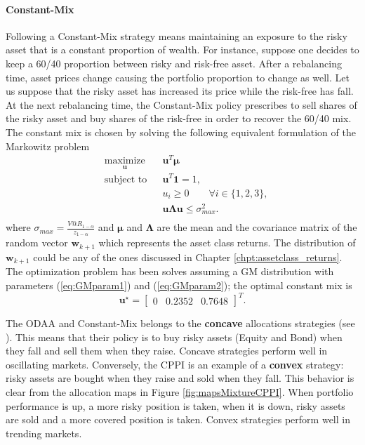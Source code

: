 \paragraph{Constant-Mix}
Following a Constant-Mix strategy means maintaining an exposure to the risky asset that is a constant proportion of wealth. For instance, suppose one decides to keep a 60/40 proportion between risky and risk-free asset. After a rebalancing time, asset prices change causing the portfolio proportion to change as well. Let us suppose that the risky asset has increased its price while the risk-free has fall. At the next rebalancing time, the Constant-Mix policy prescribes to sell shares of the risky asset and buy shares of the risk-free in order to recover the 60/40 mix. The constant mix is chosen by solving the following equivalent formulation of the Markowitz problem
\begin{equation*}
\begin{aligned}
& \underset{\bm{u}}{\text{maximize}} & &  \bm{u}^T\bm{\mu} \\
& \text{subject to} & & \bm{u}^T\bm{1}=1, \\
& & & u_i \geq 0 \qquad \forall i \in \{1,2,3\},\\
& & &\bm{u}\bm{\Lambda}\bm{u} \leq \sigma_{max}^2.\\
\end{aligned}
\end{equation*}
where $\sigma_{max}=\frac{V@R_{1-\alpha}}{z_{1-\alpha}}$ and $\bm{\mu}$ and $\bm{\Lambda}$ are the mean and the covariance matrix of the random vector $\bm{w}_{k+1}$ which represents the asset class returns.
The distribution of $\bm{w}_{k+1}$ could be any of the ones discussed in Chapter \ref{chpt:assetclass_returns}. The optimization problem has been solves assuming a GM distribution with parameters (\ref{eq:GMparam1}) and (\ref{eq:GMparam2}); the optimal constant mix is
\[ \bm{u}^{\star} = \begin{bmatrix} 0 & 0.2352 & 0.7648 \end{bmatrix}^T.\]


The ODAA and Constant-Mix belongs to the \textbf{concave} allocations strategies (see \cite{Plasse2013}). This means that their policy is to buy risky assets (Equity and Bond) when they fall and sell them when they raise. Concave strategies perform well in oscillating markets. Conversely, the \gls{CPPI} is an example of a \textbf{convex} strategy: risky assets are bought when they raise and sold when they fall. This behavior is clear from the allocation maps in Figure \ref{fig:mapsMixtureCPPI}. When portfolio performance is up, a more risky position is taken, when it is down, risky assets are sold and a more covered position is taken. Convex strategies perform well in trending markets.

